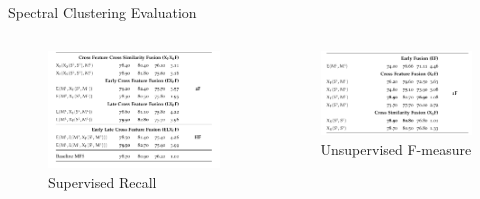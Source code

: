 \documentclass[10pt,=table]{beamer}
\begin{document}
\begin{frame}{Spectral Clustering Evaluation}
\begin{columns}
	\begin{minipage}[c][0.5\textheight][c]{\linewidth}
	\begin{figure}
		\centering
		\includegraphics[width=1\linewidth]{image2/Chapitre4/wsd_SC_SR}
		\caption{Supervised Recall}
	\end{figure}

	\end{minipage}
	\begin{minipage}[c][0.5\textheight][c]{\linewidth}
	\begin{figure}
		\centering
		\includegraphics[width=1\linewidth]{image2/Chapitre4/wsd_SC_UF.png}
		\caption{Unsupervised F-measure}
	\end{figure}
	\end{minipage}
	\end{columns}
\end{frame}
\end{document}
